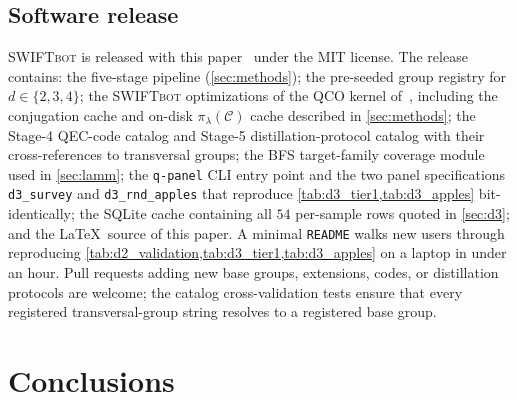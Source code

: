 \documentclass[twocolumn,superscriptaddress,showpacs,nofootinbib,notitlepage,preprintnumbers,secnumarabic,amssymb, nobibnotes, aps, prd]{revtex4-2}
\newcommand{\SWIFTbot}{\textsc{SWIFTbot}\xspace}
\begin{document}
\subsection{Software release}\label{sec:discussion_release}

\SWIFTbot is released with this paper~\cite{swiftbot_github} under the MIT license.
The release contains: the five-stage pipeline (\cref{sec:methods}); the pre-seeded group registry for $d \in \{2,3,4\}$; the \SWIFTbot optimizations of the QCO kernel of~\cite{Slowik:2025qco}, including the conjugation cache and on-disk $\pi_\lambda(\mathcal{C})$ cache described in \cref{sec:methods}; the Stage-4 QEC-code catalog and Stage-5 distillation-protocol catalog with their cross-references to transversal groups; the BFS target-family coverage module used in \cref{sec:lamm}; the \texttt{q-panel} CLI entry point and the two panel specifications \texttt{d3\_survey} and \texttt{d3\_rnd\_apples} that reproduce \cref{tab:d3_tier1,tab:d3_apples} bit-identically; the SQLite cache containing all $54$ per-sample rows quoted in \cref{sec:d3}; and the \LaTeX\ source of this paper. A minimal \texttt{README} walks new users through reproducing \cref{tab:d2_validation,tab:d3_tier1,tab:d3_apples} on a laptop in under an hour. Pull requests adding new base groups, extensions, codes, or distillation protocols are welcome; the catalog cross-validation tests ensure that every registered transversal-group string resolves to a registered base group.

\section{Conclusions}\label{sec:conclusions}
\end{document}
